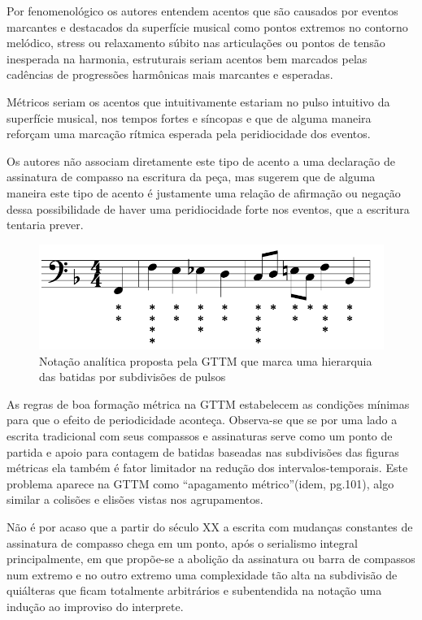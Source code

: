\documentclass[
	12pt,				%
	openright,			%
	twoside,			%
	a4paper,			%
	english,			%
	french,				%
	spanish,			%
	brazil				%
	]{abntex2}
\begin{document}
Por fenomenológico os autores entendem acentos que são causados por eventos marcantes e destacados da superfície musical como pontos extremos no contorno melódico, stress ou relaxamento súbito nas articulações ou pontos de tensão inesperada na harmonia, estruturais seriam acentos bem marcados pelas cadências de progressões harmônicas mais marcantes e esperadas.

Métricos seriam os acentos que intuitivamente estariam no pulso intuitivo da superfície musical, nos tempos fortes e síncopas e que de alguma maneira reforçam uma marcação rítmica esperada pela peridiocidade dos eventos. 

Os autores não associam diretamente este tipo de acento a uma declaração de assinatura de compasso na escritura da peça, mas sugerem que de alguma maneira este tipo de acento é justamente uma relação de afirmação ou negação dessa possibilidade de haver uma peridiocidade forte nos eventos, que a escritura tentaria prever. 


\begin{figure}[htb]
	\caption{\label{fig_grafico}Notação analítica proposta pela GTTM que marca uma hierarquia das batidas por subdivisões de pulsos}
	\begin{center}
	    \includegraphics[scale=0.45]{gttm/GTTM-m21-metes.png}
	\end{center}
\end{figure}


As regras de boa formação métrica na GTTM estabelecem as condições mínimas para que o efeito de periodicidade aconteça.  Observa-se que se por uma lado a escrita tradicional com seus compassos e assinaturas serve como um ponto de partida e apoio para contagem de batidas baseadas nas subdivisões das figuras métricas ela também é fator limitador na redução dos intervalos-temporais. Este problema aparece na GTTM como “apagamento métrico”(idem, pg.101), algo similar a colisões e elisões vistas nos agrupamentos. 

Não é por acaso que a partir do século XX a escrita com mudanças constantes de assinatura de compasso chega em um ponto, após o serialismo integral principalmente, em que propõe-se a abolição da assinatura ou barra de compassos num extremo e no outro extremo uma complexidade tão alta na subdivisão de quiálteras que ficam totalmente arbitrários e subentendida na notação uma indução ao improviso do interprete.
\end{document}
